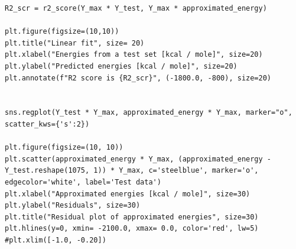 \documentclass[a4paper,oneside,openright,11pt]{book}
\begin{document}
\begin{verbatim}
R2_scr = r2_score(Y_max * Y_test, Y_max * approximated_energy)

plt.figure(figsize=(10,10))
plt.title("Linear fit", size= 20)
plt.xlabel("Energies from a test set [kcal / mole]", size=20)
plt.ylabel("Predicted energies [kcal / mole]", size=20)
plt.annotate(f"R2 score is {R2_scr}", (-1800.0, -800), size=20)


sns.regplot(Y_test * Y_max, approximated_energy * Y_max, marker="o", scatter_kws={'s':2})

plt.figure(figsize=(10, 10))
plt.scatter(approximated_energy * Y_max, (approximated_energy - Y_test.reshape(1075, 1)) * Y_max, c='steelblue', marker='o', edgecolor='white', label='Test data')
plt.xlabel("Approximated energies [kcal / mole]", size=30)
plt.ylabel("Residuals", size=30)
plt.title("Residual plot of approximated energies", size=30)
plt.hlines(y=0, xmin= -2100.0, xmax= 0.0, color='red', lw=5)
#plt.xlim([-1.0, -0.20])



\end{verbatim}

\printbibliography[
heading=bibintoc,
title={Bibliography}
]



\end{document}
